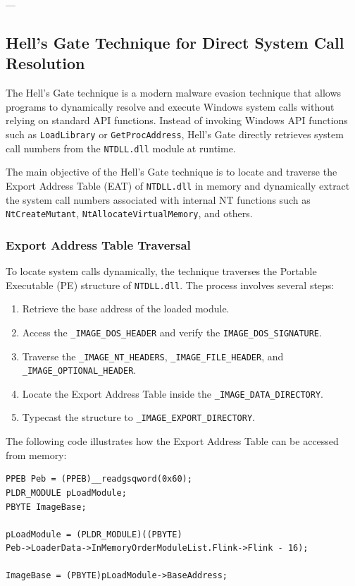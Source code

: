 ---
\subsection{Hell's Gate Technique for Direct System Call Resolution}

The Hell's Gate technique is a modern malware evasion technique that allows programs to dynamically resolve 
and execute Windows system calls without relying on standard API functions. Instead of invoking Windows API 
functions such as \texttt{LoadLibrary} or \texttt{GetProcAddress}, Hell's Gate directly retrieves system call 
numbers from the \texttt{NTDLL.dll} module at runtime.

The main objective of the Hell's Gate technique is to locate and traverse the Export Address Table (EAT) of 
\texttt{NTDLL.dll} in memory and dynamically extract the system call numbers associated with internal NT 
functions such as \texttt{NtCreateMutant}, \texttt{NtAllocateVirtualMemory}, and others.

\subsubsection{Export Address Table Traversal}

To locate system calls dynamically, the technique traverses the Portable Executable (PE) structure of 
\texttt{NTDLL.dll}. The process involves several steps:

\begin{enumerate}
\item Retrieve the base address of the loaded module.
\item Access the \texttt{\_IMAGE\_DOS\_HEADER} and verify the \texttt{IMAGE\_DOS\_SIGNATURE}.
\item Traverse the \texttt{\_IMAGE\_NT\_HEADERS}, \texttt{\_IMAGE\_FILE\_HEADER}, and \texttt{\_IMAGE\_OPTIONAL\_HEADER}.
\item Locate the Export Address Table inside the \texttt{\_IMAGE\_DATA\_DIRECTORY}.
\item Typecast the structure to \texttt{\_IMAGE\_EXPORT\_DIRECTORY}.
\end{enumerate}

The following code illustrates how the Export Address Table can be accessed from memory:

\begin{lstlisting}
PPEB Peb = (PPEB)__readgsqword(0x60);
PLDR_MODULE pLoadModule;
PBYTE ImageBase;

pLoadModule = (PLDR_MODULE)((PBYTE)
Peb->LoaderData->InMemoryOrderModuleList.Flink->Flink - 16);

ImageBase = (PBYTE)pLoadModule->BaseAddress;

\end{lstlisting}

